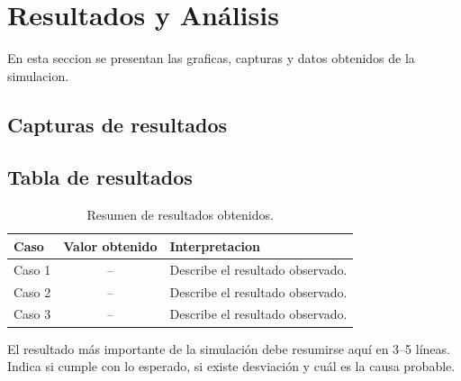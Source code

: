\chapter{Resultados y Análisis}
En esta seccion se presentan las graficas, capturas y datos obtenidos de la simulacion.

\section{Capturas de resultados}

\section{Tabla de resultados}

\begin{table}[H]
\centering
\caption{Resumen de resultados obtenidos.}
\label{tab:resultados}
\begin{tabularx}{\linewidth}{l c X}
\toprule
Caso & Valor obtenido & Interpretacion \\
\midrule
Caso 1 & -- & Describe el resultado observado. \\
Caso 2 & -- & Describe el resultado observado. \\
Caso 3 & -- & Describe el resultado observado. \\
\bottomrule
\end{tabularx}
\end{table}

\begin{resultbox}
El resultado más importante de la simulación debe resumirse aquí en 3--5 líneas. Indica si cumple con lo esperado, si existe desviación y cuál es la causa probable.
\end{resultbox}

